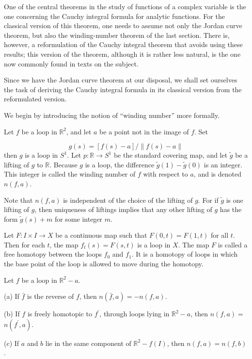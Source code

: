 
One of the central theorems in the study of functions of a complex variable is the one concerning the Cauchy integral formula for analytic functions. For the classical version of this theorem, one needs to assume not only the Jordan curve theorem, but also the winding-number theorem of the last section. There is, however, a reformulation of the Cauchy integral theorem that avoids using these results; this version of the theorem, although it is rather less natural, is the one now commonly found in texts on the subject.

Since we have the Jordan curve theorem at our disposal, we shall set ourselves the task of deriving the Cauchy integral formula in its classical version from the reformulated version.

We begin by introducing the notion of ``winding number'' more formally.

\begin{definition}
Let \(f\) be a loop in \(\mathbb{R}^{2}\), and let \(a\) be a point not in the image of \(f\). Set

\[
g( s) = [ {f( s) - a}] /\parallel f( s) - a\parallel
\]
then \(g\) is a loop in \(S^{1}\). Let \(p : \mathbb{R} \rightarrow {S}^{1}\) be the standard covering map, and let \(\tilde{g}\) be a lifting of \(g\) to \(\mathbb{R}\). Because \(g\) is a loop, the difference \(\tilde{g}(1) - \tilde{g}( 0)\) is an integer. This integer is called the winding number of \(f\) with respect to \(a\), and is denoted \( n( {f,a})\).
\end{definition}

Note that \(n( {f,a})\) is independent of the choice of the lifting of \(g\). For if \(\tilde{g}\) is one lifting of \(g\), then uniqueness of liftings implies that any other lifting of \(g\) has the form \(\tilde{g}( s) + m\) for some integer \(m\).

\begin{definition}
Let \(F : I \times I \rightarrow X\) be a continuous map such that \(F( {0,t}) = F( {1,t})\) for all \(t\). Then for each \(t\), the map \(f_{t}( s) = F( {s,t})\) is a loop in \(X\). The map \(F\) is called a free homotopy between the loops \(f_{0}\) and \(f_{1}\). It is a homotopy of loops in which the base point of the loop is allowed to move during the homotopy.
\end{definition}

\begin{lemma}
\label{lem:\thetheorem}
Let \(f\) be a loop in \(\mathbb{R}^{2} - a\).

(a) If \(\bar{f}\) is the reverse of \(f\), then \(n( {\bar{f},a}) = - n( {f,a})\).

(b) If \(f\) is freely homotopic to \(f^{\prime }\), through loops lying in \(\mathbb{R}^{2} - a\), then \(n( {f,a}) =\) \(n( {f^{\prime },a})\).

(c) If \(a\) and \(b\) lie in the same component of \(\mathbb{R}^{2} - f( I)\), then \(n( {f,a}) = n( {f,b})\).
\end{lemma}

